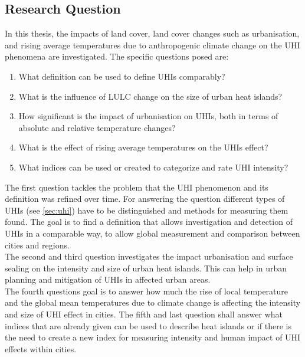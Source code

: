 \documentclass[12pt,a4paper, english,twoside]{scrartcl}
\begin{document}
 \subsection{Research Question}
  In this thesis, the impacts of land cover, land cover changes such as urbanisation, and rising average temperatures due to anthropogenic climate change on the \gls{UHI} phenomena are investigated.
  The specific questions posed are:
  \begin{enumerate}
    \item What definition can be used to define \glspl{UHI} comparably?\label{q1}
    \item What is the influence of \gls{LULC} change on the size of urban heat islands?\label{q2}
    \item How significant is the impact of urbanisation on \glspl{UHI}, both in terms of absolute and relative temperature changes?\label{q3}
    \item What is the effect of rising average temperatures on the \glspl{UHI} effect?\label{q4}
    \item What indices can be used or created to categorize and rate \gls{UHI} intensity?\label{q5}
  \end{enumerate}
  The first question tackles the problem that the \gls{UHI} phenomenon and its definition was refined over time. 
  For answering the question different types of \glspl{UHI} (see \cref{sec:uhi}) have to be distinguished and methods for measuring them found. 
  The goal is to find a definition that allows investigation and detection of \glspl{UHI} in a comparable way, to allow global measurement and comparison between cities and regions.\\ 
  The second and third question investigates the impact urbanisation and surface sealing on the intensity and size of urban heat islands. 
  This can help in urban planning and mitigation of \glspl{UHI} in affected urban areas.\\ 
  The fourth questions goal is to answer how much the rise of local temperature and the global mean temperatures due to climate change is affecting the intensity and size of \gls{UHI} effect in cities.%
  The fifth and last question shall answer what indices that are already given can be used to describe heat islands or if there is the need to create a new index for measuring intensity and human impact of \gls{UHI} effects within cities.
\end{document}
